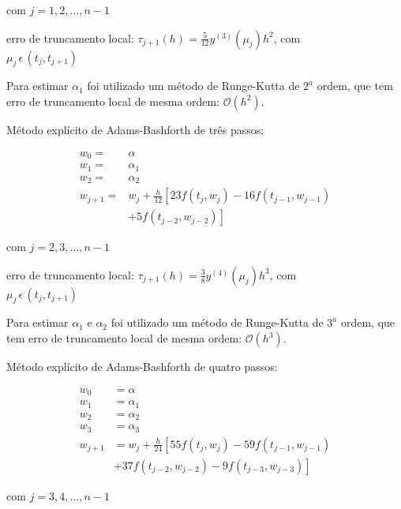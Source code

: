 \documentclass[final,5p]{elsarticle}
\numberwithin{equation}{section}
\begin{document}
        \noindent com $j=1,2,\ldots,n-1$

        \noindent erro de truncamento local: $\tau_{j+1}(h) = \frac{5}{12}y^{(3)}(\mu_j)h^2$, com \\ $\mu_j \, \epsilon \, (t_j,t_{j+1})$

        Para estimar $\alpha_1$ foi utilizado um método de Runge-Kutta de $2^a$ ordem, que tem erro de truncamento local de mesma ordem: $\mathcal{O}(h^2)$.

        Método explícito de Adams-Bashforth de três passos:

        \begin{align}
            w_0 =& \alpha \nonumber \\
            w_1 =& \alpha_1 \nonumber \\
            w_2 =& \alpha_2 \nonumber \\
            w_{j+1} =& w_j + \frac{h}{12} \left[ 23 f(t_j, w_j) - 16 f(t_{j-1}, w_{j-1}) \right. \nonumber \\
            & \left. + 5 f(t_{j-2}, w_{j-2}) \right] \label{eq:adamsbashforth3}
        \end{align}

        \noindent com $j=2,3,\ldots,n-1$

        \noindent erro de truncamento local: $\tau_{j+1}(h) = \frac{3}{8}y^{(4)}(\mu_j)h^3$, com \\ $\mu_j \, \epsilon \, (t_j,t_{j+1})$

        Para estimar $\alpha_1$ e $\alpha_2$ foi utilizado um método de Runge-Kutta de $3^a$ ordem, que tem erro de truncamento local de mesma ordem: $\mathcal{O}(h^3)$.

        Método explícito de Adams-Bashforth de quatro passos:

        \begin{align}
            w_0 &= \alpha \nonumber \\
            w_1 &= \alpha_1 \nonumber \\
            w_2 &= \alpha_2 \nonumber \\
            w_3 &= \alpha_3 \nonumber \\
            w_{j+1} &= w_j + \frac{h}{24} \left[ 55 f(t_j, w_j) - 59 f(t_{j-1}, w_{j-1}) \right. \nonumber \\
            & \left. + 37 f(t_{j-2}, w_{j-2}) - 9 f(t_{j-3}, w_{j-3}) \right] \label{eq:adamsbashforth4}
        \end{align}

        \noindent com $j=3,4,\ldots,n-1$
\end{document}
